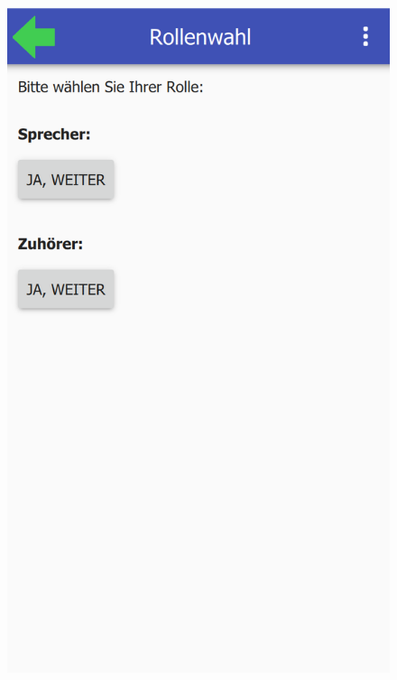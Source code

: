 \begin{figure}[ht!]
	\centering
	\begin{minipage}{0.31\linewidth}
		\centering
		\includegraphics[scale=0.5]{GUI/Bilder/2-Rollenwahl.PNG}
	\end{minipage}
	\begin{minipage}{0.31\linewidth}
		\centering

\end{minipage}
\end{figure}
